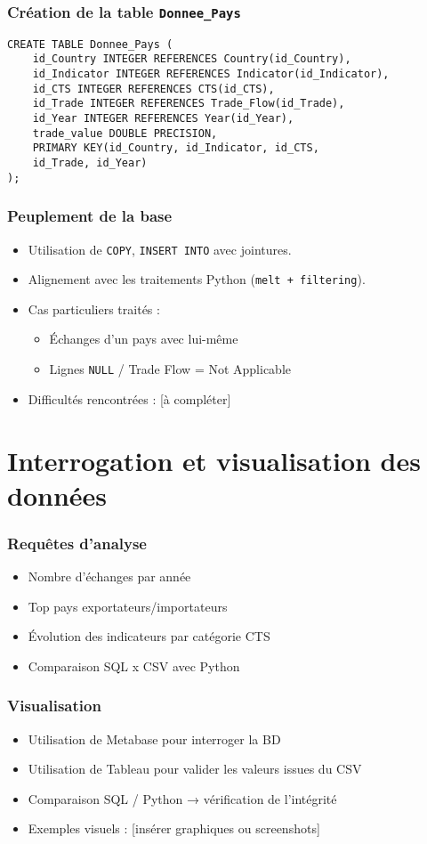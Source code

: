 \documentclass[11pt]{beamer}
\begin{document}
\begin{frame}[fragile]
  \frametitle{Création de la table \texttt{Donnee\_Pays}}
\begin{verbatim}
CREATE TABLE Donnee_Pays (
    id_Country INTEGER REFERENCES Country(id_Country),
    id_Indicator INTEGER REFERENCES Indicator(id_Indicator),
    id_CTS INTEGER REFERENCES CTS(id_CTS),
    id_Trade INTEGER REFERENCES Trade_Flow(id_Trade),
    id_Year INTEGER REFERENCES Year(id_Year),
    trade_value DOUBLE PRECISION,
    PRIMARY KEY(id_Country, id_Indicator, id_CTS, 
    id_Trade, id_Year)
);
\end{verbatim}
\end{frame}


\begin{frame}
  \frametitle{Peuplement de la base}
  \begin{itemize}
    \item Utilisation de \texttt{COPY}, \texttt{INSERT INTO} avec jointures.
    \item Alignement avec les traitements Python (\texttt{melt + filtering}).
    \item Cas particuliers traités : 
      \begin{itemize}
        \item Échanges d’un pays avec lui-même
        \item Lignes \texttt{NULL} / Trade Flow = Not Applicable
      \end{itemize}
    \item Difficultés rencontrées : [à compléter]
  \end{itemize}
\end{frame}

\section{Interrogation et visualisation des données}
\begin{frame}
  \frametitle{Requêtes d’analyse}
  \begin{itemize}
    \item Nombre d’échanges par année
    \item Top pays exportateurs/importateurs
    \item Évolution des indicateurs par catégorie CTS
    \item Comparaison SQL x CSV avec Python
  \end{itemize}
\end{frame}

\begin{frame}
  \frametitle{Visualisation}
  \begin{itemize}
    \item Utilisation de Metabase pour interroger la BD
    \item Utilisation de Tableau pour valider les valeurs issues du CSV
    \item Comparaison SQL / Python → vérification de l’intégrité
    \item Exemples visuels : [insérer graphiques ou screenshots]
  \end{itemize}
\end{frame}
\end{document}
